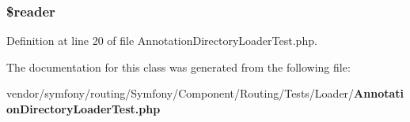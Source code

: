 \subsubsection[{\$reader}]{\setlength{\rightskip}{0pt plus 5cm}\$reader\hspace{0.3cm}{\ttfamily [protected]}}\label{class_symfony_1_1_component_1_1_routing_1_1_tests_1_1_loader_1_1_annotation_directory_loader_test_a56ac4227ed0f1f20fd1d31918f3bd2ff}


Definition at line 20 of file Annotation\+Directory\+Loader\+Test.\+php.



The documentation for this class was generated from the following file\+:\begin{DoxyCompactItemize}
\item 
vendor/symfony/routing/\+Symfony/\+Component/\+Routing/\+Tests/\+Loader/{\bf Annotation\+Directory\+Loader\+Test.\+php}\end{DoxyCompactItemize}
